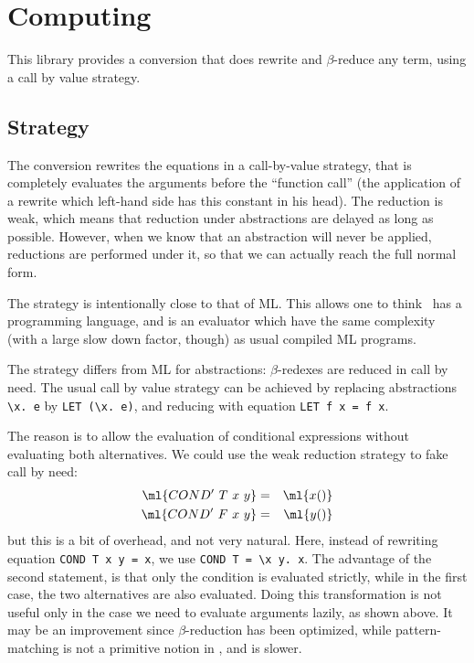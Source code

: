 
\chapter{Computing}

This library provides a conversion that does rewrite and
$\beta$-reduce any term, using a call by value strategy.


\section{Strategy}

The  conversion rewrites the equations in a call-by-value
strategy, that is completely evaluates the arguments before the
``function call'' (the application of a rewrite which left-hand side
has this constant in his head). The reduction is weak, which means
that reduction under abstractions are delayed as long as
possible. However, when we know that an abstraction will never be
applied, reductions are performed under it, so that we can actually
reach the full normal form.

The strategy is intentionally close to that of ML. This allows one to
think \HOL\ has a programming language, and  is an 
evaluator which have the same complexity (with a large slow down factor,
though) as usual compiled ML programs.

The strategy differs from ML for abstractions: $\beta$-redexes are
reduced in call by need. The usual call by value strategy can be
achieved by replacing abstractions \verb#\x. e# by
\verb#LET (\x. e)#, and reducing  with equation
\verb#LET f x = f x#.

The reason is to allow the evaluation of conditional expressions
without evaluating both alternatives. We could use the weak reduction
strategy to fake call by need:
\begin{eqnarray*}
\ml{COND'~T~x~y} & = & \ml{x()} \\
\ml{COND'~F~x~y} & = & \ml{y()}
\end{eqnarray*}
but this is a bit of overhead, and not very natural. Here, instead of
rewriting equation \verb#COND T x y = x#, we use
\verb#COND T = \x y. x#. The advantage of the second statement, is
that only the condition is evaluated strictly, while in the first
case, the two alternatives are also evaluated. Doing this
transformation is not useful only in the case we need to evaluate
arguments lazily, as shown above. It may be an improvement since
$\beta$-reduction has been optimized, while pattern-matching is not a
primitive notion in \HOL, and is slower.



